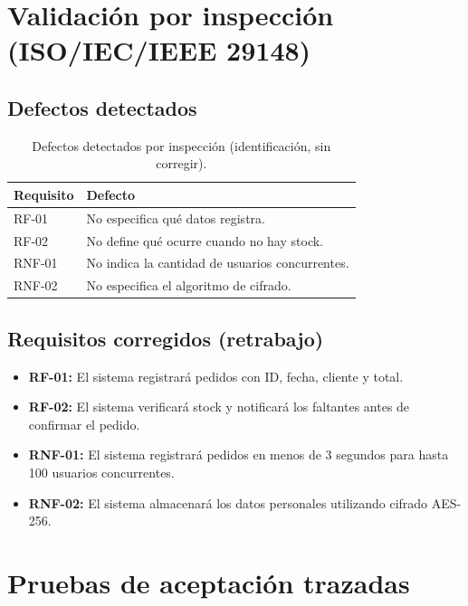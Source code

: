 \documentclass[11pt,a4paper]{article}
\begin{document}
\newpage
\section{Validación por inspección (ISO/IEC/IEEE 29148)}
\label{sec:p7}

\subsection*{Defectos detectados}

\begin{table}[h!]
\centering
\begin{tabular}{ll}
\toprule
\textbf{Requisito} & \textbf{Defecto} \\
\midrule
RF-01  & No especifica qué datos registra. \\
RF-02  & No define qué ocurre cuando no hay stock. \\
RNF-01 & No indica la cantidad de usuarios concurrentes. \\
RNF-02 & No especifica el algoritmo de cifrado. \\
\bottomrule
\end{tabular}
\caption{Defectos detectados por inspección (identificación, sin corregir).}
\end{table}

\subsection*{Requisitos corregidos (retrabajo)}

\begin{itemize}[leftmargin=1.4cm]
\item \textbf{RF-01:} El sistema registrará pedidos con ID, fecha, cliente y total.
\item \textbf{RF-02:} El sistema verificará stock y notificará los faltantes antes
      de confirmar el pedido.
\item \textbf{RNF-01:} El sistema registrará pedidos en menos de 3 segundos para
      hasta 100 usuarios concurrentes.
\item \textbf{RNF-02:} El sistema almacenará los datos personales utilizando
      cifrado AES-256.
\end{itemize}

\newpage
\section{Pruebas de aceptación trazadas}
\label{sec:p8}
\end{document}
